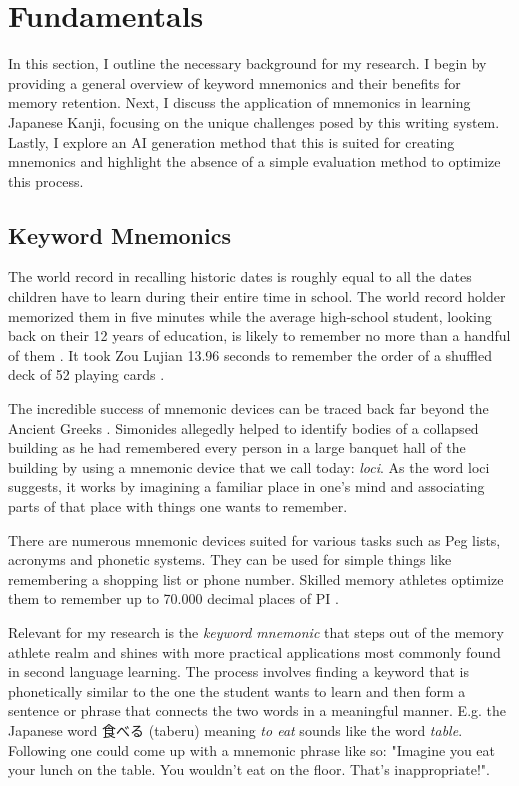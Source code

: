\section{Fundamentals} \label{sec:fundamentals}
In this section, I outline the necessary background for my research. I begin by providing a general overview of keyword mnemonics and their benefits for memory retention. Next, I discuss the application of mnemonics in learning Japanese Kanji, focusing on the unique challenges posed by this writing system. Lastly, I explore an AI generation method that this is suited for creating mnemonics and highlight the absence of a simple evaluation method to optimize this process.
\subsection{Keyword Mnemonics}
The world record in recalling historic dates is roughly equal to all the dates children have to learn during their entire time in school. The world record holder memorized them in five minutes while the average high-school student, looking back on their 12 years of education, is likely to remember no more than a handful of them \cite{how_to_become_a_memory_master}. It took Zou Lujian 13.96 seconds to remember the order of a shuffled deck of 52 playing cards \cite{record_recall_playing_cards}.

The incredible success of mnemonic devices can be traced back far beyond the Ancient Greeks \cite{white_2014}. Simonides allegedly helped to identify bodies of a collapsed building as he had remembered every person in a large banquet hall of the building by using a mnemonic device that we call today: \emph{loci}. As the word loci suggests, it works by imagining a familiar place in one's mind and associating parts of that place with things one wants to remember.

There are numerous mnemonic devices suited for various tasks such as Peg lists, acronyms and phonetic systems. They can be used for simple things like remembering a shopping list or phone number. Skilled memory athletes optimize them to remember up to 70.000 decimal places of PI \cite{record_decimal_pi}. 

Relevant for my research is the \emph{keyword mnemonic} that steps out of the memory athlete realm and shines with more practical applications most commonly found in second language learning. The process involves finding a keyword that is phonetically similar to the one the student wants to learn and then form a sentence or phrase that connects the two words in a meaningful manner. E.g. the Japanese word 食べる (taberu) meaning \emph{to eat} sounds like the word \emph{table}. Following one could come up with a mnemonic phrase like so: "Imagine you eat your lunch on the table. You wouldn't eat on the floor. That's inappropriate!". 

